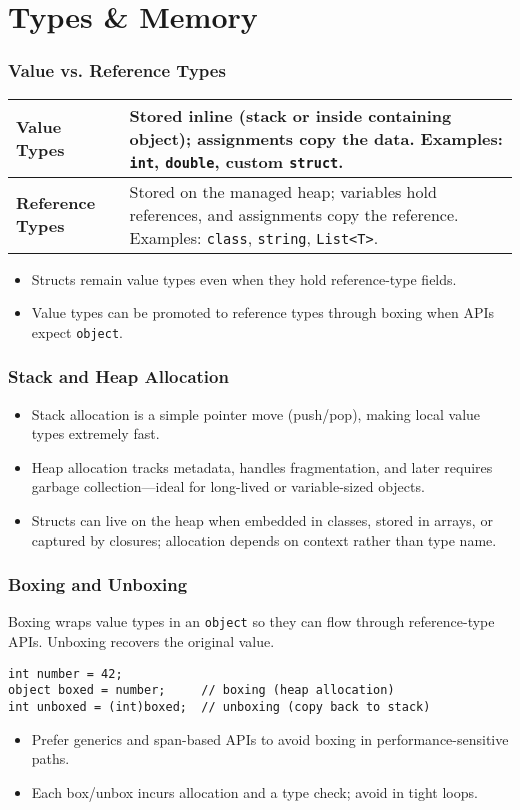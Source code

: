\documentclass[aspectratio=169]{beamer}
\newcommand{\code}[1]{\texttt{#1}}
\newcommand{\ProgressStep}[1]{\progressstep{#1}}
\newcommand{\ThisFrameTitle}[1]{\frametitle{#1}}
\begin{document}
\section{Types \& Memory}
\begin{frame}
  \ProgressStep{2}\ThisFrameTitle{Value vs. Reference Types}
  \begin{tabularx}{\linewidth}{@{}lY@{}}
    \toprule
    \textbf{Value Types} & Stored inline (stack or inside containing object); assignments copy the data. Examples: \code{int}, \code{double}, custom \code{struct}. \\
    \midrule
    \textbf{Reference Types} & Stored on the managed heap; variables hold references, and assignments copy the reference. Examples: \code{class}, \code{string}, \code{List<T>}. \\
    \bottomrule
  \end{tabularx}
  \vspace{0.6em}
  \begin{itemize}
    \item Structs remain value types even when they hold reference-type fields.
    \item Value types can be promoted to reference types through boxing when APIs expect \code{object}.
  \end{itemize}
\end{frame}

\begin{frame}
  \ProgressStep{3}\ThisFrameTitle{Stack and Heap Allocation}
  \begin{itemize}
    \item Stack allocation is a simple pointer move (push/pop), making local value types extremely fast.
    \item Heap allocation tracks metadata, handles fragmentation, and later requires garbage collection—ideal for long-lived or variable-sized objects.
    \item Structs can live on the heap when embedded in classes, stored in arrays, or captured by closures; allocation depends on context rather than type name.
  \end{itemize}
\end{frame}

\begin{frame}[fragile]
  \ProgressStep{4}\ThisFrameTitle{Boxing and Unboxing}
  Boxing wraps value types in an \code{object} so they can flow through reference-type APIs. Unboxing recovers the original value.
  \vspace{0.6em}
  \begin{verbatim}
int number = 42;
object boxed = number;     // boxing (heap allocation)
int unboxed = (int)boxed;  // unboxing (copy back to stack)
  \end{verbatim}
  \begin{itemize}
    \item Prefer generics and span-based APIs to avoid boxing in performance-sensitive paths.
    \item Each box/unbox incurs allocation and a type check; avoid in tight loops.
  \end{itemize}
\end{frame}
\end{document}
